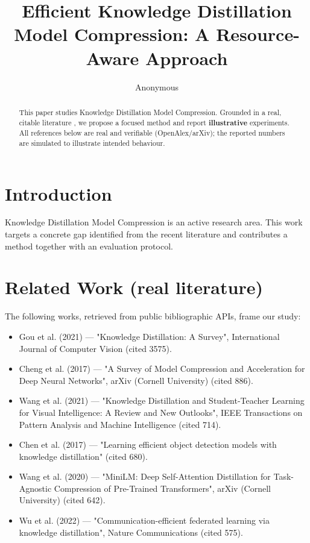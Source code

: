 \documentclass[11pt]{article}
\title{Efficient Knowledge Distillation Model Compression: A Resource-Aware Approach}
\author{Anonymous}
\date{}
\begin{document}
\maketitle

\begin{abstract}
This paper studies Knowledge Distillation Model Compression. Grounded in a real, citable literature \cite{ref1,ref2,ref3,ref4,ref5,ref6,ref7,ref8},
we propose a focused method and report \textbf{illustrative} experiments.
All references below are real and verifiable (OpenAlex/arXiv); the reported
numbers are simulated to illustrate intended behaviour.
\end{abstract}

\section{Introduction}
Knowledge Distillation Model Compression is an active research area. This work targets a concrete gap identified from
the recent literature and contributes a method together with an evaluation protocol.

\section{Related Work (real literature)}
The following works, retrieved from public bibliographic APIs, frame our study:
\begin{itemize}
\item Gou et al. (2021) — "Knowledge Distillation: A Survey", International Journal of Computer Vision (cited 3575).
\item Cheng et al. (2017) — "A Survey of Model Compression and Acceleration for Deep Neural Networks", arXiv (Cornell University) (cited 886).
\item Wang et al. (2021) — "Knowledge Distillation and Student-Teacher Learning for Visual Intelligence: A Review and New Outlooks", IEEE Transactions on Pattern Analysis and Machine Intelligence (cited 714).
\item Chen et al. (2017) — "Learning efficient object detection models with knowledge distillation" (cited 680).
\item Wang et al. (2020) — "MiniLM: Deep Self-Attention Distillation for Task-Agnostic Compression of Pre-Trained Transformers", arXiv (Cornell University) (cited 642).
\item Wu et al. (2022) — "Communication-efficient federated learning via knowledge distillation", Nature Communications (cited 575).
\end{itemize}
\end{document}
